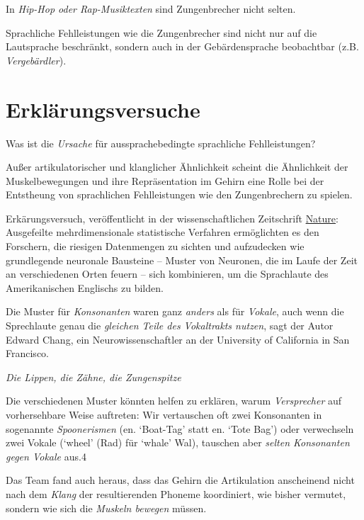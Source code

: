 \documentclass[
  letterpaper,
]{scrbook}
\begin{document}
In \emph{Hip-Hop oder Rap-Musiktexten} sind Zungenbrecher nicht selten.

Sprachliche Fehlleistungen wie die Zungenbrecher sind nicht nur auf die
Lautsprache beschränkt, sondern auch in der Gebärdensprache beobachtbar
(z.B. \emph{Vergebärdler}).

\hypertarget{erkluxe4rungsversuche}{%
\section{Erklärungsversuche}\label{erkluxe4rungsversuche}}

Was ist die \emph{Ursache} für aussprachebedingte sprachliche
Fehlleistungen?

Außer artikulatorischer und klanglicher Ähnlichkeit scheint die
Ähnlichkeit der Muskelbewegungen und ihre Repräsentation im Gehirn eine
Rolle bei der Entstheung von sprachlichen Fehlleistungen wie den
Zungenbrechern zu spielen.

Erkärungsversuch, veröffentlicht in der wissenschaftlichen Zeitschrift
\href{https://www.nature.com/articles/nature.2013.12471.pdf}{Nature}:\\

Ausgefeilte mehrdimensionale statistische Verfahren ermöglichten es den
Forschern, die riesigen Datenmengen zu sichten und aufzudecken wie
grundlegende neuronale Bausteine -- Muster von Neuronen, die im Laufe
der Zeit an verschiedenen Orten feuern -- sich kombinieren, um die
Sprachlaute des Amerikanischen Englischs zu bilden.

Die Muster für \emph{Konsonanten} waren ganz \emph{anders} als für
\emph{Vokale}, auch wenn die Sprechlaute genau die \emph{gleichen Teile
des Vokaltrakts nutzen}, sagt der Autor Edward Chang, ein
Neurowissenschaftler an der University of California in San Francisco.

\emph{Die Lippen, die Zähne, die Zungenspitze}

Die verschiedenen Muster könnten helfen zu erklären, warum
\emph{Versprecher} auf vorhersehbare Weise auftreten: Wir vertauschen
oft zwei Konsonanten in sogenannte \emph{Spoonerismen} (en. `Boat-Tag'
statt en. `Tote Bag') oder verwechseln zwei Vokale (`wheel' (Rad) für
`whale' Wal), tauschen aber \emph{selten Konsonanten gegen Vokale} aus.4

Das Team fand auch heraus, dass das Gehirn die Artikulation anscheinend
nicht nach dem \emph{Klang} der resultierenden Phoneme koordiniert, wie
bisher vermutet, sondern wie sich die \emph{Muskeln bewegen} müssen.
\end{document}

